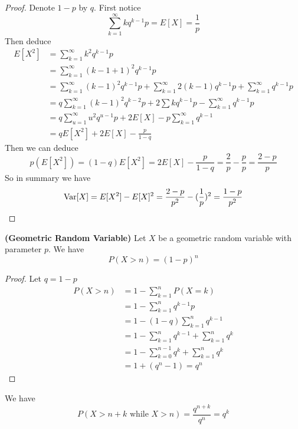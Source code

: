 \documentclass{report}
\begin{document}
\begin{proof}
  Denote $1-p$ by $q$. First notice
\begin{equation}
\sum_{k=1}^\infty kq^{k-1}p=E[X]=\frac{1}{p}
\end{equation}
Then deduce
\begin{align}
E[X^2]&=\sum_{k=1}^\infty k^2q^{k-1}p\\
&=\sum_{k=1}^\infty (k-1+1)^2q^{k-1}p\\
&=\sum_{k=1}^\infty (k-1)^2q^{k-1}p+\sum_{k=1}^\infty 2(k-1)q^{k-1}p+\sum_{k=1}^\infty q^{k-1}p\\
&=q\sum_{k=1}^\infty (k-1)^2q^{k-2}p+2\sum kq^{k-1}p-\sum_{k=1}^\infty q^{k-1}p\\
&=q\sum_{u=1}^\infty u^2q^{u-1}p+2E[X]-p\sum_{k=1}^\infty q^{k-1}\\
&=qE[X^2]+2E[X]-\frac{p}{1-q}
\end{align}
Then we can deduce
\begin{equation}
 p(E[X^2])= (1-q)E[X^2]=2E[X]-\frac{p}{1-q}=\frac{2}{p}-\frac{p}{p}=\frac{2-p}{p}
\end{equation}
So in summary we have
\begin{equation}
\text{Var} [X]=E[X^2]-E[X]^2=\frac{2-p}{p^2}-(\frac{1}{p})^2=\frac{1-p}{p^2}
\end{equation}
\end{proof}
\begin{theorem}
\label{1.1.23}
\textbf{(Geometric Random Variable)} Let $X$ be a geometric random variable with parameter $p$. We have
\begin{equation}
P(X>n)=(1-p)^n
\end{equation}
\end{theorem}
\begin{proof}
Let $q=1-p$
\begin{align}
P(X>n)&=1-\sum_{k=1}^n P(X=k)\\
&=1-\sum_{k=1}^n q^{k-1}p\\
&=1-(1-q)\sum_{k=1}^n q^{k-1}\\
&=1-\sum_{k=1}^n q^{k-1}+\sum_{k=1}^n q^{k}\\
&=1-\sum_{k=0}^{n-1} q^k+\sum_{k=1}^n q^k\\
&=1+(q^n-1)=q^n
\end{align}
\end{proof}
\begin{corollary}
\label{1.1.24}
We have
\begin{equation}
  P(X>n+k\text{ while }X>n)=\frac{q^{n+k}}{q^{n}}=q^k
\end{equation}
\end{corollary}
\end{document}
